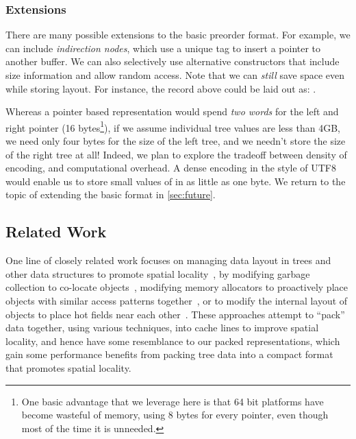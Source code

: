 \documentclass[a4paper,english]{lipics-v2016}
\begin{document}

\subsubsection{Extensions} \label{sec:extensions1}
There are many possible extensions to the basic preorder format. For example, we
can include {\em indirection nodes}, which use a unique tag to insert a pointer to
another buffer. We can also selectively use alternative constructors that
include size information and allow random access.  Note that we can {\em still}
save space even while storing layout.  For instance, the  record above
could be laid out as: {}.

Whereas a pointer based representation would spend {\em two words} for the left
and right pointer (16 bytes\footnote{One basic advantage that we leverage here
  is that 64 bit platforms have become wasteful of memory, using 8 bytes for
  every pointer, even though most of the time it is unneeded.  }), if we assume
individual tree values are less than 4GB, we need only four bytes for the size
of the left tree, and we needn't store the size of the right tree at all!
Indeed, we plan to explore the tradeoff between density of encoding, and
computational overhead.  A dense encoding in the style of UTF8 would enable us
to store small values of  in as little as one byte.
%
We return to the topic of extending the basic format in \cref{sec:future}.


\subsection{Related Work}


One line of closely related work focuses on managing data layout in trees and
other data structures to promote spatial
locality~\cite{Chilimbi1999,Chilimbi1999b,Truong1998,Lattner2005,Chilimbi1999a},
by modifying garbage collection to co-locate objects~\cite{Chilimbi1999a},
modifying memory allocators to proactively place objects with similar access
patterns together~\cite{Lattner2005,Chilimbi1999}, or to modify the internal
layout of objects to place hot fields near each other~\cite{Chilimbi1999b}.
These approaches attempt to ``pack'' data together, using various techniques,
into cache lines to improve spatial locality, and hence have some resemblance
to our packed representations, which gain some performance benefits from
packing tree data into a compact format that promotes spatial locality.
\end{document}
